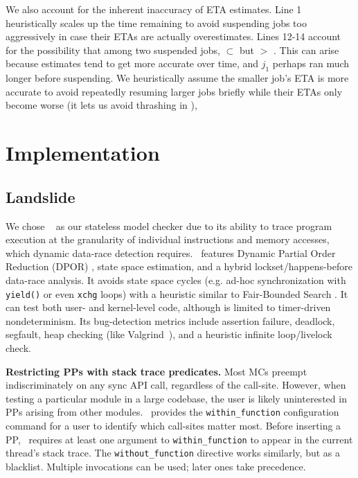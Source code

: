 %
We also account for the inherent inaccuracy of ETA estimates.
Line 1 heuristically scales up the time remaining to avoid suspending jobs too aggressively
in case their ETAs are actually overestimates.
Lines 12-14 account for the
possibility that among two suspended jobs,
 $\subset$ 
but
 $>$ .
This can arise because estimates tend to get more accurate over time,
and $j_1$ perhaps ran much longer before suspending.
We heuristically assume the smaller job's ETA is more accurate
to avoid repeatedly resuming larger jobs briefly while their ETAs only become worse
(it lets us avoid thrashing in \quicksand),


\section{Implementation}

\subsection{Landslide}
\label{sec:landslide}

We chose \landslide~\cite{landslide} as our stateless model checker due to its ability to trace program execution at the granularity of individual instructions and memory accesses, which dynamic data-race detection requires.
\landslide~features Dynamic Partial Order Reduction (DPOR) \cite{dpor}, state space estimation, and a hybrid lockset/happens-before data-race analysis.
It avoids state space cycles (e.g. ad-hoc synchronization with {\tt yield()} or even {\tt xchg} loops) with a heuristic similar to Fair-Bounded Search \cite{bpor}. %
It can test both user- and kernel-level code, although is limited to timer-driven nondeterminism.
Its bug-detection metrics include assertion failure, deadlock, segfault, heap checking (like Valgrind~\cite{valgrind}), and a heuristic infinite loop/livelock check.

{\bf Restricting PPs with stack trace predicates.}
Most MCs preempt indiscriminately on any sync API call, regardless of the call-site.
However, when testing a particular module in a large codebase,
the user is likely uninterested in PPs arising from other modules.
\landslide~provides the {\tt within\_function} configuration command for a user to identify which call-sites matter most.
Before inserting a PP, \landslide~requires at least one argument to {\tt within\_function} to appear in the current thread's stack trace.
The {\tt without\_function} directive works similarly, but as a blacklist.
Multiple invocations can be used; later ones take precedence.

